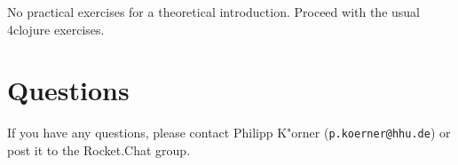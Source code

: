 \documentclass[11pt,a4paper]{article}
\begin{document}
No practical exercises for a theoretical introduction.
Proceed with the usual 4clojure exercises.


%
%
%
%
%
%
%
%
%
%
%
%


	\section*{Questions}
	If you have any questions, please contact Philipp K"orner (\texttt{p.koerner@hhu.de}) or post it to the Rocket.Chat group.
\end{document}
